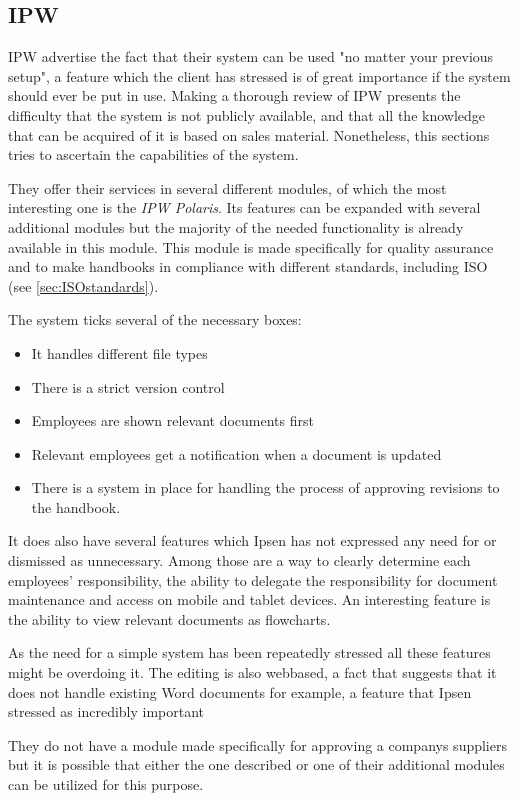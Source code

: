 \subsection{IPW}
IPW advertise the fact that their system can be used "no matter your previous setup", a feature which the client has stressed is of great importance if the system should ever be put in use.
Making a thorough review of IPW presents the difficulty that the system is not publicly available, and that all the knowledge that can be acquired of it is based on sales material.
Nonetheless, this sections tries to ascertain the capabilities of the system.

They offer their services in several different modules, of which the most interesting one is the \textit{IPW Polaris}.
Its features can be expanded with several additional modules but the majority of the needed functionality is already available in this module.
This module is made specifically for quality assurance and to make handbooks in compliance with different standards, including ISO (see \cref{sec:ISOstandards}).

The system ticks several of the necessary boxes: 

\begin{itemize}
        \item It handles different file types
        \item There is a strict version control
        \item Employees are shown relevant documents first
        \item Relevant employees get a notification when a document is updated
        \item There is a system in place for handling the process of approving revisions to the handbook.
\end{itemize}

It does also have several features which Ipsen has not expressed any need for or dismissed as unnecessary.
Among those are a way to clearly determine each employees' responsibility, the ability to delegate the responsibility for document maintenance and access on mobile and tablet devices.
An interesting feature is the ability to view relevant documents as flowcharts.

As the need for a simple system has been repeatedly stressed all these features might be overdoing it.
The editing is also webbased, a fact that suggests that it does not handle existing Word documents for example, a feature that Ipsen stressed as incredibly important

They do not have a module made specifically for approving a companys suppliers but it is possible that either the one described or one of their additional modules can be utilized for this purpose.
